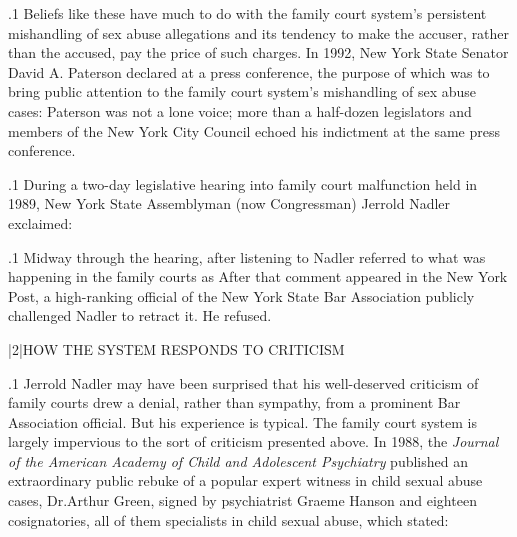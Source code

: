 \documentclass[11pt, twoside]{article}
\begin{document}
{\p.1{%
Beliefs like these have much to do with the family court system’s persistent mishandling of sex abuse allegations and its tendency to make
the accuser, rather than the accused, pay the price of such charges. In
1992, New York State Senator David A. Paterson declared at a press conference, the purpose of which was to bring public attention to the family
court system’s mishandling of sex abuse cases:  Paterson was not a lone voice; more than a half-dozen legislators and members of the New York City Council echoed his indictment
at the same press conference.
}%

\p.1{%
During a two-day legislative hearing into family court malfunction
held in 1989, New York State Assemblyman (now Congressman) Jerrold
Nadler exclaimed: 
}%

\p.1{%
Midway through the hearing, after listening to 
Nadler referred to what was happening in the family courts as  After that comment appeared in the New
York Post, a high-ranking official of the New York State Bar Association
publicly challenged Nadler to retract it. He refused.
}%


\s|2|{HOW THE SYSTEM RESPONDS TO CRITICISM}

\p.1{%
\noindent{}Jerrold Nadler may have been surprised that his well-deserved criticism of family courts drew a denial, rather than sympathy, from a prominent Bar
Association official. But his experience is typical. The family court system is largely impervious to the sort of criticism presented above.
In 1988, the \textit{Journal of the American Academy of Child and Adolescent
Psychiatry} published an extraordinary public rebuke of a popular expert
witness in child sexual abuse cases, Dr.\@ Arthur Green, signed by psychiatrist Graeme Hanson and eighteen cosignatories, all of them specialists
in child sexual abuse, which stated: 
}%

}
\end{document}
